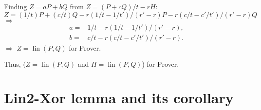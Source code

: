 \documentclass{mathcryptology} %
\DeclareMathOperator{\lin}{lin}
\theoremstyle{title}
\theoremstyle{titleof}
\renewenvironment{proof}{\noindent{\bfseries Proof:} }{}
\begin{document}
\begin{proof}
        Finding $Z=aP+bQ$ from $Z=\left(P+cQ\right)/t-rH$:
        \begin{equation*}
        	Z=\left(1/t\right)P+\left(c/t\right)Q-r\left(1/t-1/t'\right)/\left(r' - r\right)P-r\left(c/t-c'/t'\right)/\left(r' - r\right)Q
        \end{equation*}
        $\Rightarrow$
        \begin{align*}
            a= & 1/t-r(1/t-1/t')/(r'-r),\\ 
            b= & c/t-r(c/t-c'/t')/(r'-r).        
        \end{align*}        
        $\Rightarrow$ $Z=\lin\left(P, Q\right)$ for Prover.

        Thus, ($Z=\lin\left(P, Q\right)$ and $H=\lin\left(P, Q\right)$) for Prover.
    \end{proof}


\section{Lin2-Xor lemma and its corollary}
\end{document}
